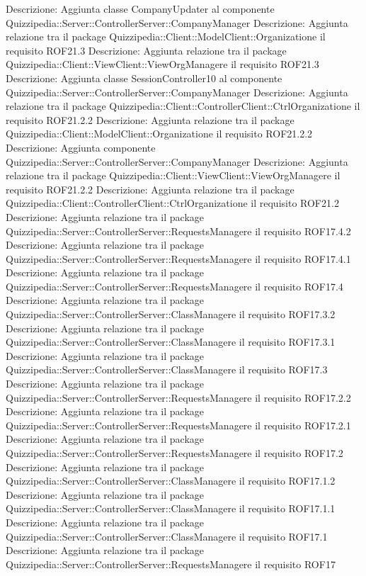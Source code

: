 Descrizione: Aggiunta classe CompanyUpdater al componente Quizzipedia::Server::ControllerServer::CompanyManager 
Descrizione: Aggiunta relazione tra il package Quizzipedia::Client::ModelClient::Organizatione il requisito ROF21.3 
Descrizione: Aggiunta relazione tra il package Quizzipedia::Client::ViewClient::ViewOrgManagere il requisito ROF21.3 
Descrizione: Aggiunta classe SessionController10 al componente Quizzipedia::Server::ControllerServer::CompanyManager 
Descrizione: Aggiunta relazione tra il package Quizzipedia::Client::ControllerClient::CtrlOrganizatione il requisito ROF21.2.2 
Descrizione: Aggiunta relazione tra il package Quizzipedia::Client::ModelClient::Organizatione il requisito ROF21.2.2 
Descrizione: Aggiunta componente Quizzipedia::Server::ControllerServer::CompanyManager 
Descrizione: Aggiunta relazione tra il package Quizzipedia::Client::ViewClient::ViewOrgManagere il requisito ROF21.2.2 
Descrizione: Aggiunta relazione tra il package Quizzipedia::Client::ControllerClient::CtrlOrganizatione il requisito ROF21.2 
Descrizione: Aggiunta relazione tra il package Quizzipedia::Server::ControllerServer::RequestsManagere il requisito ROF17.4.2 
Descrizione: Aggiunta relazione tra il package Quizzipedia::Server::ControllerServer::RequestsManagere il requisito ROF17.4.1 
Descrizione: Aggiunta relazione tra il package Quizzipedia::Server::ControllerServer::RequestsManagere il requisito ROF17.4 
Descrizione: Aggiunta relazione tra il package Quizzipedia::Server::ControllerServer::ClassManagere il requisito ROF17.3.2 
Descrizione: Aggiunta relazione tra il package Quizzipedia::Server::ControllerServer::ClassManagere il requisito ROF17.3.1 
Descrizione: Aggiunta relazione tra il package Quizzipedia::Server::ControllerServer::ClassManagere il requisito ROF17.3 
Descrizione: Aggiunta relazione tra il package Quizzipedia::Server::ControllerServer::RequestsManagere il requisito ROF17.2.2 
Descrizione: Aggiunta relazione tra il package Quizzipedia::Server::ControllerServer::RequestsManagere il requisito ROF17.2.1 
Descrizione: Aggiunta relazione tra il package Quizzipedia::Server::ControllerServer::RequestsManagere il requisito ROF17.2 
Descrizione: Aggiunta relazione tra il package Quizzipedia::Server::ControllerServer::ClassManagere il requisito ROF17.1.2 
Descrizione: Aggiunta relazione tra il package Quizzipedia::Server::ControllerServer::ClassManagere il requisito ROF17.1.1 
Descrizione: Aggiunta relazione tra il package Quizzipedia::Server::ControllerServer::ClassManagere il requisito ROF17.1 
Descrizione: Aggiunta relazione tra il package Quizzipedia::Server::ControllerServer::RequestsManagere il requisito ROF17 
